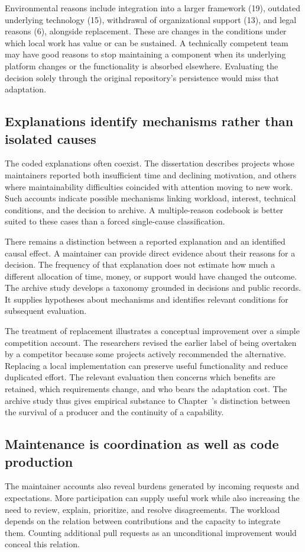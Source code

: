 Environmental reasons include integration into a larger framework (19), outdated underlying technology (15), withdrawal of organizational support (13), and legal reasons (6), alongside replacement. These are changes in the conditions under which local work has value or can be sustained. A technically competent team may have good reasons to stop maintaining a component when its underlying platform changes or the functionality is absorbed elsewhere. Evaluating the decision solely through the original repository's persistence would miss that adaptation.

\subsection{Explanations identify mechanisms rather than isolated causes}
The coded explanations often coexist. The dissertation describes projects whose maintainers reported both insufficient time and declining motivation, and others where maintainability difficulties coincided with attention moving to new work. Such accounts indicate possible mechanisms linking workload, interest, technical conditions, and the decision to archive. A multiple-reason codebook is better suited to these cases than a forced single-cause classification.

There remains a distinction between a reported explanation and an identified causal effect. A maintainer can provide direct evidence about their reasons for a decision. The frequency of that explanation does not estimate how much a different allocation of time, money, or support would have changed the outcome. The archive study develops a taxonomy grounded in decisions and public records. It supplies hypotheses about mechanisms and identifies relevant conditions for subsequent evaluation.

The treatment of replacement illustrates a conceptual improvement over a simple competition account. The researchers revised the earlier label of being overtaken by a competitor because some projects actively recommended the alternative. Replacing a local implementation can preserve useful functionality and reduce duplicated effort. The relevant evaluation then concerns which benefits are retained, which requirements change, and who bears the adaptation cost. The archive study thus gives empirical substance to Chapter~'s distinction between the survival of a producer and the continuity of a capability.

\subsection{Maintenance is coordination as well as code production}
The maintainer accounts also reveal burdens generated by incoming requests and expectations. More participation can supply useful work while also increasing the need to review, explain, prioritize, and resolve disagreements. The workload depends on the relation between contributions and the capacity to integrate them. Counting additional pull requests as an unconditional improvement would conceal this relation.

